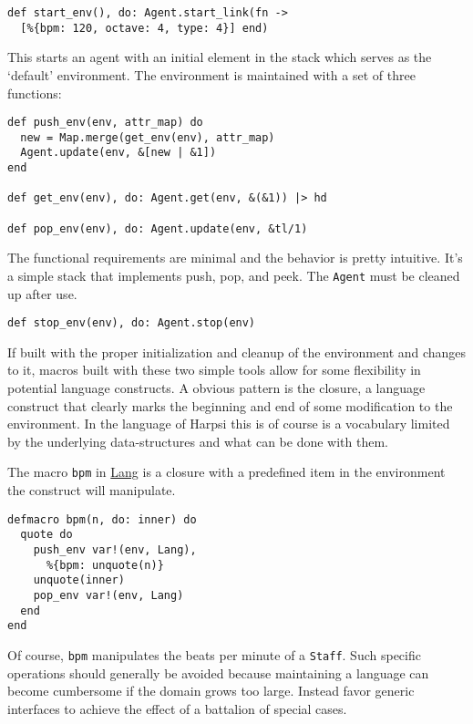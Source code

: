 \documentclass[11pt]{article}
\begin{document}
\begin{verbatim}
def start_env(), do: Agent.start_link(fn ->
  [%{bpm: 120, octave: 4, type: 4}] end)
\end{verbatim}

This starts an agent with an initial element in the stack which
serves as the `default' environment. The environment is maintained
with a set of three functions:

\begin{verbatim}
def push_env(env, attr_map) do
  new = Map.merge(get_env(env), attr_map)
  Agent.update(env, &[new | &1])
end

def get_env(env), do: Agent.get(env, &(&1)) |> hd

def pop_env(env), do: Agent.update(env, &tl/1)
\end{verbatim}

The functional requirements are minimal and the behavior
is pretty intuitive. It's a simple stack that implements push, pop,
and peek. The \texttt{Agent} must be cleaned up after use.

\begin{verbatim}
def stop_env(env), do: Agent.stop(env)
\end{verbatim}

If built with the proper initialization and cleanup of the
environment and changes to it, macros built with these two simple
tools allow for some flexibility in potential language
constructs. A obvious pattern is the closure, a language construct
that clearly marks the beginning and end of some modification to
the environment. In the language of Harpsi this is of course is a
vocabulary limited by the underlying data-structures and what can
be done with them.

The macro \texttt{bpm} in \href{lib/lang.ex}{Lang} is a closure with a predefined item in the
environment the construct will manipulate.

\begin{verbatim}
defmacro bpm(n, do: inner) do
  quote do
    push_env var!(env, Lang),
      %{bpm: unquote(n)}
    unquote(inner)
    pop_env var!(env, Lang)
  end
end
\end{verbatim}

Of course, \texttt{bpm} manipulates the beats per minute of a
\texttt{Staff}. Such specific operations should generally be avoided
because maintaining a language can become cumbersome if the domain
grows too large. Instead favor generic interfaces to achieve the
effect of a battalion of special cases.
\end{document}
